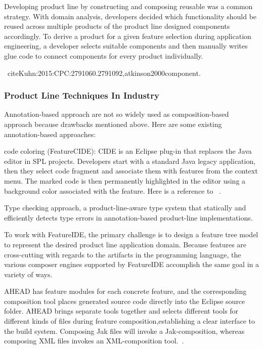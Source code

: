 Developing product line by constructing and composing reusable was a common strategy. With domain analysis,
developers decided which functionality should be reused across multiple products of the product line designed
components accordingly. To derive a product for a given feature selection during application engineering, a
developer selects suitable components and then manually writes glue code to connect components for every
product individually.

~cite{Kuhn:2015:CPC:2791060.2791092,atkinson2000component}.


\subsubsection{Product Line Techniques In Industry}

Annotation-based approach are not so widely used as composition-based approach because drawbacks mentioned above.
Here are some existing annotation-based approaches:

code coloring (FeatureCIDE): CIDE is an Eclipse plug-in that replaces the Java editor in SPL projects. Developers
start with a standard Java legacy application, then they select code fragment and associate them with features
 from the context menu. The marked code is then permanently highlighted in the editor using a background color
 associated with the feature. Here is a reference to ~\cite{CIDE:Eclipse}.


Type checking approach,  a product-line-aware type system that statically and efficiently detects type errors in
annotation-based product-line implementations.~\cite{Kastner:2012}


To work with FeatureIDE, the primary challenge is to design a feature tree model to represent the desired product
line application domain. Because features are cross-cutting with regards to the artifacts in the programming
language, the various composer engines supported by FeatureIDE accomplish the same goal in a variety of ways.

AHEAD has feature modules for each concrete feature, and the corresponding composition tool places generated
source code directly into the Eclipse source folder. AHEAD brings separate tools together and selects different
tools for different kinds of files during feature composition,establishing a clear interface to the build
system. Composing Jak files will invoke a Jak-composition, whereas composing XML files invokes an
XML-composition tool.~\cite{Batory2004FeatureorientedPA}.


